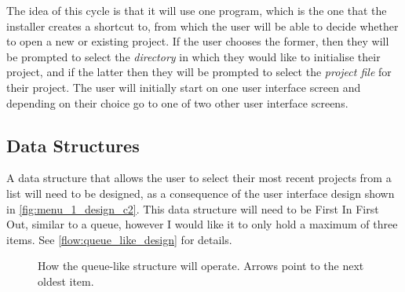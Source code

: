     The idea of this cycle is that it will use one program, which is the one that the installer creates a shortcut to, from which the user will be able to decide whether to open a new or existing project. If the user chooses the former, then they will be prompted to select the \textit{directory} in which they would like to initialise their project, and if the latter then they will be prompted to select the \textit{project file} for their project. 
    The user will initially start on one user interface screen and depending on their choice go to one of two other user interface screens.

    \subsection{Data Structures}
    
        A data structure that allows the user to select their most recent projects from a list will need to be designed, as a consequence of the user interface design shown in \autoref{fig:menu_1_design_c2}.
        This data structure will need to be First In First Out, similar to a queue, however I would like it to only hold a maximum of three items. 
        See \autoref{flow:queue_like_design} for details.

        \begin{figure}[!ht]
            \centering
            \caption{How the queue-like structure will operate. Arrows point to the next oldest item.}
            \label{flow:queue_like_design}
        \end{figure}

